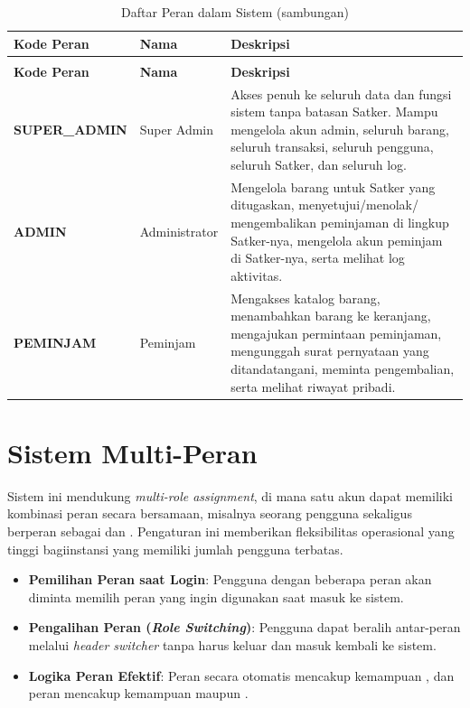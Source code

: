 \documentclass[
  12pt,
  a4paper,
  oneside,
  final
]{report}
\begin{document}
\begin{longtable}[!htbp]{p{3.5cm} p{4cm} p{6.5cm}}
  \caption{Daftar Peran dalam Sistem}
  \label{tab:roles} \\

  \toprule
  \textbf{Kode Peran} & \textbf{Nama} & \textbf{Deskripsi} \\
  \midrule
  \endfirsthead

  \caption[]{Daftar Peran dalam Sistem (sambungan)} \\
  \toprule
  \textbf{Kode Peran} & \textbf{Nama} & \textbf{Deskripsi} \\
  \midrule
  \endhead

  \bottomrule
  \endfoot

  \rowcolor{lightblue}\textbf{SUPER\_ADMIN} & Super Admin &
  Akses penuh ke seluruh data dan fungsi sistem tanpa batasan
  Satker. Mampu mengelola akun admin, seluruh barang, seluruh
  transaksi, seluruh pengguna, seluruh Satker, dan seluruh log. \\
  \rowcolor{white}\textbf{ADMIN} & Administrator &
  Mengelola barang untuk Satker yang ditugaskan, menyetujui/menolak/
  mengembalikan peminjaman di lingkup Satker-nya, mengelola akun
  peminjam di Satker-nya, serta melihat log aktivitas. \\
  \rowcolor{white}\textbf{PEMINJAM} & Peminjam &
  Mengakses katalog barang, menambahkan barang ke keranjang,
  mengajukan permintaan peminjaman, mengunggah surat pernyataan
  yang ditandatangani, meminta pengembalian, serta melihat
  riwayat pribadi. \\
\end{longtable}

\section{Sistem Multi-Peran}
Sistem ini mendukung {\it multi-role assignment}, di mana satu akun
dapat memiliki kombinasi peran secara bersamaan, misalnya seorang
pengguna sekaligus berperan sebagai {\roleAdmin} dan {\rolePeminjam}.
Pengaturan ini memberikan fleksibilitas operasional yang tinggi
bagiinstansi yang memiliki jumlah pengguna terbatas.

\begin{itemize}
  \item {\bfseries Pemilihan Peran saat Login}: Pengguna dengan beberapa
        peran akan diminta memilih peran yang ingin digunakan saat masuk
        ke sistem.
  \item {\bfseries Pengalihan Peran ({\it Role Switching})}: Pengguna
        dapat beralih antar-peran melalui {\it header switcher} tanpa
        harus keluar dan masuk kembali ke sistem.
  \item {\bfseries Logika Peran Efektif}: Peran {\roleAdmin}
        secara otomatis mencakup kemampuan {\rolePeminjam},
        dan peran {\roleSuperAdmin} mencakup kemampuan {\roleAdmin}
        maupun {\rolePeminjam}.
\end{itemize}
\end{document}
